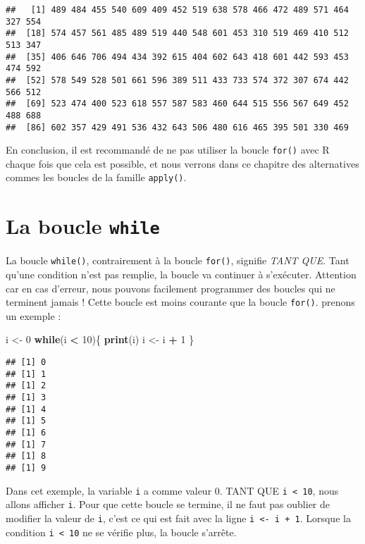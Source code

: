 \documentclass[]{book}
\newenvironment{Shaded}{\begin{snugshade}}{\end{snugshade}}
\newcommand{\KeywordTok}[1]{\textcolor[rgb]{0.13,0.29,0.53}{\textbf{#1}}}
\newcommand{\DecValTok}[1]{\textcolor[rgb]{0.00,0.00,0.81}{#1}}
\newcommand{\StringTok}[1]{\textcolor[rgb]{0.31,0.60,0.02}{#1}}
\newcommand{\ControlFlowTok}[1]{\textcolor[rgb]{0.13,0.29,0.53}{\textbf{#1}}}
\newcommand{\OperatorTok}[1]{\textcolor[rgb]{0.81,0.36,0.00}{\textbf{#1}}}
\newcommand{\NormalTok}[1]{#1}
\theoremstyle{definition}
\theoremstyle{definition}
\theoremstyle{definition}
\theoremstyle{remark}
\begin{document}
\begin{verbatim}
##   [1] 489 484 455 540 609 409 452 519 638 578 466 472 489 571 464 327 554
##  [18] 574 457 561 485 489 519 440 548 601 453 310 519 469 410 512 513 347
##  [35] 406 646 706 494 434 392 615 404 602 643 418 601 442 593 453 474 592
##  [52] 578 549 528 501 661 596 389 511 433 733 574 372 307 674 442 566 512
##  [69] 523 474 400 523 618 557 587 583 460 644 515 556 567 649 452 488 688
##  [86] 602 357 429 491 536 432 643 506 480 616 465 395 501 330 469
\end{verbatim}

En conclusion, il est recommandé de ne pas utiliser la boucle
\texttt{for()} avec R chaque fois que cela est possible, et nous verrons
dans ce chapitre des alternatives commes les boucles de la famille
\texttt{apply()}.

\hypertarget{l17while}{\section{\texorpdfstring{La boucle
\texttt{while}}{La boucle while}}\label{l17while}}

La boucle \texttt{while()}, contrairement à la boucle \texttt{for()},
signifie \emph{TANT QUE}. Tant qu'une condition n'est pas remplie, la
boucle va continuer à s'exécuter. Attention car en cas d'erreur, nous
pouvons facilement programmer des boucles qui ne terminent jamais !
Cette boucle est moins courante que la boucle \texttt{for()}. prenons un
exemple :

\begin{Shaded}
\begin{Highlighting}[]
\NormalTok{i <-}\StringTok{ }\DecValTok{0}
\ControlFlowTok{while}\NormalTok{(i }\OperatorTok{<}\StringTok{ }\DecValTok{10}\NormalTok{)\{}
  \KeywordTok{print}\NormalTok{(i)}
\NormalTok{  i <-}\StringTok{ }\NormalTok{i }\OperatorTok{+}\StringTok{ }\DecValTok{1}
\NormalTok{\}}
\end{Highlighting}
\end{Shaded}

\begin{verbatim}
## [1] 0
## [1] 1
## [1] 2
## [1] 3
## [1] 4
## [1] 5
## [1] 6
## [1] 7
## [1] 8
## [1] 9
\end{verbatim}

Dans cet exemple, la variable \texttt{i} a comme valeur 0. TANT QUE
\texttt{i\ \textless{}\ 10}, nous allons afficher \texttt{i}. Pour que
cette boucle se termine, il ne faut pas oublier de modifier la valeur de
\texttt{i}, c'est ce qui est fait avec la ligne
\texttt{i\ \textless{}-\ i\ +\ 1}. Lorsque la condition
\texttt{i\ \textless{}\ 10} ne se vérifie plus, la boucle s'arrête.
\end{document}
